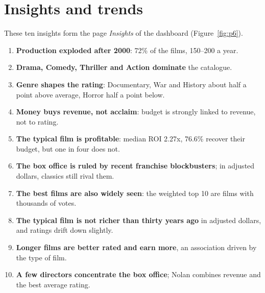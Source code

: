 \documentclass[12pt,a4paper]{article}
\begin{document}



\section{Insights and trends}\label{sec:insights}

These ten insights form the page \emph{Insights} of the dashboard (Figure~\ref{fig:p6}).

\begin{enumerate}
\item \textbf{Production exploded after 2000}: 72\% of the films, 150--200 a year.
\item \textbf{Drama, Comedy, Thriller and Action dominate} the catalogue.
\item \textbf{Genre shapes the rating}: Documentary, War and History about half a point above
average, Horror half a point below.
\item \textbf{Money buys revenue, not acclaim}: budget is strongly linked to revenue, not
to rating.
\item \textbf{The typical film is profitable}: median ROI 2.27x, 76.6\% recover their
budget, but one in four does not.
\item \textbf{The box office is ruled by recent franchise blockbusters}; in adjusted
dollars, classics still rival them.
\item \textbf{The best films are also widely seen}: the weighted top 10 are films with
thousands of votes.
\item \textbf{The typical film is not richer than thirty years ago} in adjusted dollars,
and ratings drift down slightly.
\item \textbf{Longer films are better rated and earn more}, an association driven by the
type of film.
\item \textbf{A few directors concentrate the box office}; Nolan combines revenue and the
best average rating.
\end{enumerate}
\end{document}
